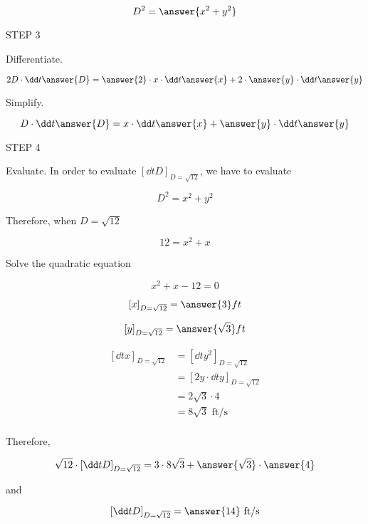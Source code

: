 \documentclass{ximera}
\begin{document}
\begin{exercise}
\[
D^2=\answer{x^2+y^2}
\]

STEP 3

Differentiate.

\[
2 D\cdot \dd t{\answer{D}}=\answer{2}\cdot x\cdot  \dd t{\answer{x}}+2\cdot\answer{y}\cdot  \dd t{\answer{y}}
\]

Simplify.

\[
 D\cdot \dd t{\answer{D}}=x\cdot  \dd t{\answer{x}}+\answer{y}\cdot  \dd t{\answer{y}}
\]


STEP 4

Evaluate. In order to evaluate $\left[\dd t{D}\right]_{D=\sqrt{12}}$, we have to evaluate


\begin{hint}
\[
D^2=x^2+y^2
\]

Therefore, when $D=\sqrt{12}$

\[
12=x^2+x
\]


Solve the quadratic equation

\[
x^2+x-12=0
\]
\end{hint}


\[
\left[x\right]_{D=\sqrt{12}}=\answer{3} ft
\]

\[
\left[y\right]_{D=\sqrt{12}}=\answer{\sqrt{3}} ft
\]


\begin{align}
\left[\dd t{x}\right]_{D=\sqrt{12}}&=\left[\dd t{y^2}\right]_{D=\sqrt{12}}\\
&=\left[2y\cdot \dd t{y}\right]_{D=\sqrt{12}}\\
&=2\sqrt{3}\cdot4\\
&=8\sqrt{3}\text{   ft/s}\\
\end{align}

Therefore,

\[
 \sqrt{12}\cdot \left[\dd t{D}\right]_{D=\sqrt{12}}=3\cdot  8\sqrt{3}+\answer{\sqrt{3}}\cdot {\answer{4}}
\]


and

\[
 \left[\dd t{D}\right]_{D=\sqrt{12}}= \answer{14} \text{  ft/s}
\]
\end{exercise}
\end{document}
